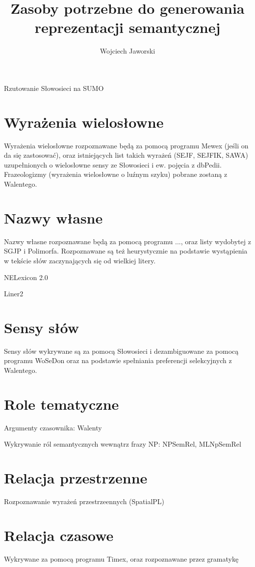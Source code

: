 \documentclass[a4paper,12pt]{article}
\title{Zasoby potrzebne do generowania reprezentacji semantycznej}
\author{Wojciech Jaworski}
\date{}
\begin{document}
\maketitle

Rzutowanie Słowosieci na SUMO

\section{Wyrażenia wielosłowne}
Wyrażenia wielosłowne rozpoznawane będą za pomocą programu Mewex (jeśli on da się zastosować), oraz istniejących list
takich wyrażeń (SEJF, SEJFIK, SAWA) uzupełnionych o wielosłowne sensy ze Słowosieci
i ew. pojęcia z dbPedii.
Frazeologizmy (wyrażenia wielosłowne o luźnym szyku) pobrane zostaną z Walentego.


\section{Nazwy własne}
Nazwy własne rozpoznawane będą za pomocą programu ..., oraz listy wydobytej z SGJP i Polimorfa.
Rozpoznawane są też heurystycznie na podstawie wystąpienia w tekście słów zaczynających się od wielkiej litery.

NELexicon 2.0

Liner2

\section{Sensy słów}
Sensy słów wykrywane są za pomocą Słowosieci i dezambiguowane za pomocą programu WoSeDon oraz na podstawie spełniania preferencji selekcyjnych z Walentego.

\section{Role tematyczne}
Argumenty czasownika: Walenty

Wykrywanie ról semantycznych wewnątrz frazy NP: NPSemRel, MLNpSemRel

\section{Relacja przestrzenne}
Rozpoznawanie wyrażeń przestrzeennych (SpatialPL)

\section{Relacja czasowe}
Wykrywane za pomocą programu Timex, oraz rozpoznawane przez gramatykę
\end{document}
